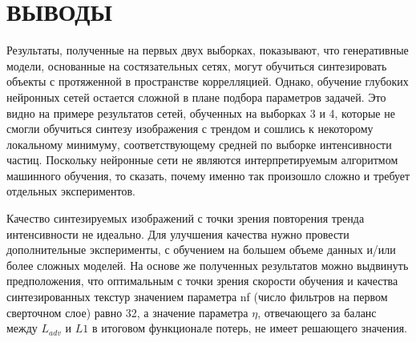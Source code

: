 \clearpage
\section*{\hfil ВЫВОДЫ \hfil}
	Результаты, полученные на первых двух выборках, показывают, что генеративные модели, основанные на состязательных сетях, могут обучиться синтезировать объекты с протяженной в пространстве коррелляцией. Однако, обучение глубоких нейронных сетей остается сложной в плане подбора параметров задачей. Это видно на примере результатов сетей, обученных на выборках 3 и 4, которые не смогли обучиться синтезу изображения с трендом и сошлись к некоторому локальному минимуму, соответствующему средней по выборке интенсивности частиц. Поскольку нейронные сети не являются интерпретируемым алгоритмом машинного обучения, то сказать, почему именно так произошло сложно и требует отдельных экспериментов.
	
	Качество синтезируемых изображений с точки зрения повторения тренда интенсивности не идеально. Для улучшения качества нужно провести дополнительные эксперименты, с обучением на большем объеме данных и/или более сложных моделей. На основе же полученных результатов можно выдвинуть предположения, что оптимальным с точки зрения скорости обучения и качества синтезированных текстур значением параметра nf (число фильтров на первом сверточном слое) равно 32, а значение параметра $\eta$, отвечающего за баланс между $L_{adv}$ и $L1$ в итоговом функционале потерь, не имеет решающего значения.
